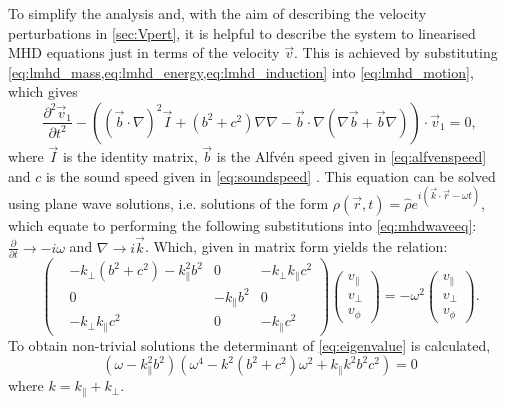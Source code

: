 To simplify the analysis and, with the aim of describing the velocity perturbations in \cref{sec:Vpert}, it is helpful to describe the system to linearised MHD equations just in terms of the velocity $\vec{v}$.
This is achieved by substituting \cref{eq:lmhd_mass,eq:lmhd_energy,eq:lmhd_induction} into \cref{eq:lmhd_motion}, which gives
\begin{equation}
    \frac{\partial^2 \vec{v}_1}{\partial t^2} - \left( (\vec{b} \cdot \nabla)^2 \vec{I} + (b^2 + c^2) \nabla\nabla - \vec{b} \cdot \nabla (\nabla\vec{b} + \vec{b}\nabla) \right) \cdot \vec{v}_1 = 0,\label{eq:mhdwaveeq}
\end{equation}
where $\vec{I}$ is the identity matrix, $\vec{b}$ is the Alfv\'en speed given in \cref{eq:alfvenspeed} and $c$ is the sound speed given in \cref{eq:soundspeed} \citep{goedbloed2004}.
This equation can be solved using plane wave solutions, i.e. solutions of the form $\rho(\vec{r}, t) = \hat{\rho} e^{i(\vec{k}\cdot\vec{r} - \omega t)}$, which equate to performing the following substitutions into \cref{eq:mhdwaveeq}: $\frac{\partial}{\partial t} \rightarrow - i \omega$ and $\nabla \rightarrow i \vec{k}$.
Which, given in matrix form yields the relation:
\begin{equation}
\begin{pmatrix}
    &-k_\perp(b^2+c^2)-k_\parallel^2 b^2			& 0			& -k_\perp k_\parallel c^2\\
    & 0									&-k_\parallel b^2	& 0\\
    &-k_\perp k_\parallel c^2					& 0			& -k_\parallel c^2
\end{pmatrix}
\begin{pmatrix}
v_\parallel\\
v_\perp\\
v_\phi
\end{pmatrix}
= - \omega^2
\begin{pmatrix}
v_\parallel\\
v_\perp\\
v_\phi
\end{pmatrix}.\label{eq:eigenvalue}
\end{equation}
To obtain non-trivial solutions the determinant of \cref{eq:eigenvalue} is calculated,
\begin{equation}
    (\omega - k_\parallel^2 b^2)\left( \omega^4 - k^2(b^2+c^2)\omega^2 + k_\parallel k^2b^2c^2 \right) = 0
\end{equation}
where $k = k_\parallel + k_\perp$.

